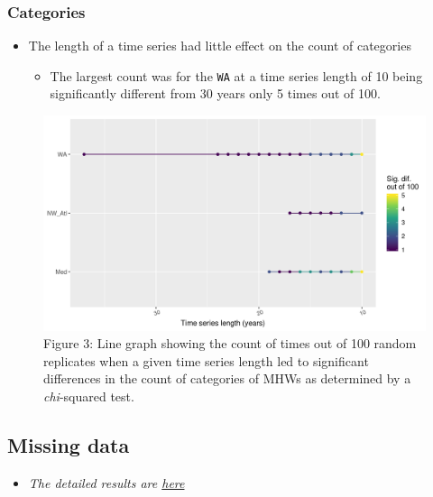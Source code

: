 \documentclass[]{article}
\providecommand{\tightlist}{%
  \setlength{\itemsep}{0pt}\setlength{\parskip}{0pt}}
\begin{document}
\subsubsection{Categories}\label{categories}

\begin{itemize}
\tightlist
\item
  The length of a time series had little effect on the count of
  categories

  \begin{itemize}
  \tightlist
  \item
    The largest count was for the \texttt{WA} at a time series length of
    10 being significantly different from 30 years only 5 times out of
    100.
  \end{itemize}
\end{itemize}

\begin{figure}
\centering
\includegraphics{../docs/articles/time_series_duration_files/figure-html/chi-pair-plot-1.png}
\caption{Figure 3: Line graph showing the count of times out of 100
random replicates when a given time series length led to significant
differences in the count of categories of MHWs as determined by a
\emph{chi}-squared test.}
\end{figure}

\subsection{Missing data}\label{missing-data}

\begin{itemize}
\tightlist
\item
  \emph{The detailed results are
  \href{https://robwschlegel.github.io/MHWdetection/articles/missing_data.html}{here}}
\end{itemize}
\end{document}

